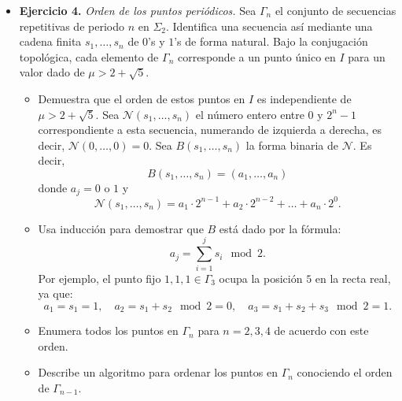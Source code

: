 \documentclass[10pt,a4paper]{book}
\begin{document}
\begin{itemize}
\item \textbf{Ejercicio 4.} \textit{Orden de los puntos periódicos.} Sea $\Gamma_n$ el conjunto de secuencias repetitivas de periodo $n$ en $\Sigma_2$. Identifica una secuencia así mediante una cadena finita $s_1, \ldots, s_n$ de $0$’s y $1$’s de forma natural. Bajo la conjugación topológica, cada elemento de $\Gamma_n$ corresponde a un punto único en $I$ para un valor dado de $\mu > 2 + \sqrt{5}$.
    \begin{itemize}
        \item[a)] Demuestra que el orden de estos puntos en $I$ es independiente de $\mu > 2 + \sqrt{5}$. Sea $\mathcal{N}(s_1, \ldots, s_n)$ el número entero entre $0$ y $2^n - 1$ correspondiente a esta secuencia, numerando de izquierda a derecha, es decir, $\mathcal{N}(0, \ldots, 0) = 0$. Sea $B(s_1, \ldots, s_n)$ la forma binaria de $\mathcal{N}$. Es decir,
        \[
        B(s_1, \ldots, s_n) = (a_1, \ldots, a_n)
        \]
        donde $a_j = 0$ o $1$ y
        \[
        \mathcal{N}(s_1, \ldots, s_n) = a_1 \cdot 2^{n-1} + a_2 \cdot 2^{n-2} + \ldots + a_n \cdot 2^0.
        \]
        \item[b)] Usa inducción para demostrar que $B$ está dado por la fórmula:
        \[
        a_j = \sum_{i=1}^j s_i \mod 2.
        \]
        Por ejemplo, el punto fijo $1,1,1 \in \Gamma_3$ ocupa la posición $5$ en la recta real, ya que:
        \[
        a_1 = s_1 = 1, \quad a_2 = s_1 + s_2 \mod 2 = 0, \quad a_3 = s_1 + s_2 + s_3 \mod 2 = 1.
        \]
        \item[c)] Enumera todos los puntos en $\Gamma_n$ para $n = 2, 3, 4$ de acuerdo con este orden.
        \item[d)] Describe un algoritmo para ordenar los puntos en $\Gamma_n$ conociendo el orden de $\Gamma_{n-1}$.
    \end{itemize}

\end{itemize}
\end{document}
